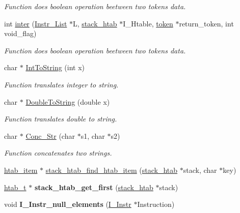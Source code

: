 \begin{DoxyCompactItemize}
\begin{DoxyCompactList}\small\item\em Function does boolean operation beetween two tokens data. \end{DoxyCompactList}\item 
int \hyperlink{group__interpret__processing_ga2136ced932cb2368bc956490eae226f1}{inter} (\hyperlink{structInstr__List}{Instr\+\_\+\+List} $\ast$L, \hyperlink{structstack__htab}{stack\+\_\+htab} $\ast$I\+\_\+\+Htable, \hyperlink{structtoken}{token} $\ast$return\+\_\+token, int void\+\_\+flag)
\begin{DoxyCompactList}\small\item\em Function does boolean operation beetween two tokens data. \end{DoxyCompactList}\item 
char $\ast$ \hyperlink{group__interpret__processing_ga5a0d1d664d0cfcc31c26179dd554bf4b}{Int\+To\+String} (int x)
\begin{DoxyCompactList}\small\item\em Function translates integer to string. \end{DoxyCompactList}\item 
char $\ast$ \hyperlink{group__interpret__processing_gab20c49a9d5c0ef5f59a1cf32a5fdccba}{Double\+To\+String} (double x)
\begin{DoxyCompactList}\small\item\em Function translates double to string. \end{DoxyCompactList}\item 
char $\ast$ \hyperlink{group__interpret__processing_ga932aeaa028a630ebe4e84383ff45008d}{Conc\+\_\+\+Str} (char $\ast$s1, char $\ast$s2)
\begin{DoxyCompactList}\small\item\em Function concatenates two strings. \end{DoxyCompactList}\item 
\hyperlink{structhtab__item}{htab\+\_\+item} $\ast$ \hyperlink{group__interpret__processing_ga600ab694c698a92ed71e4f88340e8870}{stack\+\_\+htab\+\_\+find\+\_\+htab\+\_\+item} (\hyperlink{structstack__htab}{stack\+\_\+htab} $\ast$stack, char $\ast$key)
\item 
\hypertarget{group__interpret__processing_gac4f958bd4a853211be38f7cbab86247e}{}\hyperlink{structhtab__t}{htab\+\_\+t} $\ast$ {\bfseries stack\+\_\+htab\+\_\+get\+\_\+first} (\hyperlink{structstack__htab}{stack\+\_\+htab} $\ast$stack)\label{group__interpret__processing_gac4f958bd4a853211be38f7cbab86247e}

\item 
\hypertarget{group__interpret__processing_gaa203349334ef66843a8ace3d31edf124}{}void {\bfseries I\+\_\+\+Instr\+\_\+null\+\_\+elements} (\hyperlink{structI__Instr}{I\+\_\+\+Instr} $\ast$Instruction)\label{group__interpret__processing_gaa203349334ef66843a8ace3d31edf124}

\end{DoxyCompactItemize}


